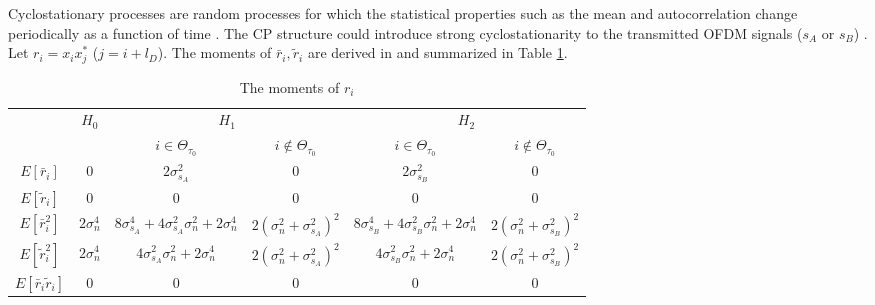 Cyclostationary processes are random processes for which the statistical properties such as the mean and autocorrelation change periodically as a function of time \cite{gardner1986statistical}. 
The CP structure could introduce strong cyclostationarity to the transmitted OFDM signals ($s_A$ or $s_B$) \cite{lunden2010robust}. 
Let $r_i=x_ix_j^\ast$ ($j=i+l_D$). The moments of $\bar{r}_i, \tilde{r}_i$ are derived in \cite{axell2011optimal} and summarized in Table \ref{Table1}. 

\begin{table}[h]
\centering
  \begin{tabular}{|c|c|c|c|c|c|}
	\hline
	\multirow{2}{*}{}           & \multirow{2}{*}{$H_0$} & \multicolumn{2}{c|}{$H_1$}                                                               & \multicolumn{2}{c|}{$H_2$}                                                               \\ \cline{3-6} 
	&                        & $i \in \Theta_{\tau_0}$                                                   & $i\notin \Theta_{\tau_0}$                          & $i\in \Theta_{\tau_0}$                                                   & $i\notin \Theta_{\tau_0}$                          \\ \hline
	$E[\bar{r}_i]$              & $0$                    & $2\sigma_{s_A}^2$                                       & $0$                            & $2\sigma_{s_B}^2$                                                         & $0$                            \\ \hline
	$E[\tilde{r}_i]$            & $0$                    & $0$                                                     & $0$                            & $0$                                                     & $0$                            \\ \hline
	$E[\bar{r}_i^2]$            & $2\sigma_n^4$          & $8\sigma_{s_A}^4+4\sigma_{s_A}^2\sigma_n^2+2\sigma_n^4$ & $2(\sigma_n^2+\sigma_{s_A}^2)^2$ & $8\sigma_{s_B}^4+4\sigma_{s_B}^2\sigma_n^2+2\sigma_n^4$ & $2(\sigma_n^2+\sigma_{s_B}^2)^2$ \\ \hline
	$E[\tilde{r}_i^2]$          & $2\sigma_n^4$          & $4\sigma_{s_A}^2\sigma_n^2+2\sigma_n^4$                 & $2(\sigma_n^2+\sigma_{s_A}^2)^2$ & $4\sigma_{s_B}^2\sigma_n^2+2\sigma_n^4$                 & $2(\sigma_n^2+\sigma_{s_B}^2)^2$ \\ \hline
	$E[\bar{r}_i\tilde{r}_i]$   & $0$                    & $0$                                                     & $0$                            & $0$                                                     & $0$                            \\ \hline
  \end{tabular}
  \caption{The moments of $r_i$}
  \label{Table1}
\end{table}

